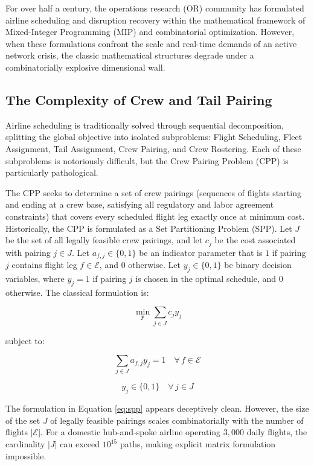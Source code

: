 \documentclass[11pt,a4paper]{book}
\begin{document}
For over half a century, the operations research (OR) community has formulated airline scheduling and disruption recovery within the mathematical framework of Mixed-Integer Programming (MIP) and combinatorial optimization. However, when these formulations confront the scale and real-time demands of an active network crisis, the classic mathematical structures degrade under a combinatorially explosive dimensional wall.

\subsection{The Complexity of Crew and Tail Pairing}\label{sec:crew_tail}

Airline scheduling is traditionally solved through sequential decomposition, splitting the global objective into isolated subproblems: Flight Scheduling, Fleet Assignment, Tail Assignment, Crew Pairing, and Crew Rostering. Each of these subproblems is notoriously difficult, but the Crew Pairing Problem (CPP) is particularly pathological. 

The CPP seeks to determine a set of crew pairings (sequences of flights starting and ending at a crew base, satisfying all regulatory and labor agreement constraints) that covers every scheduled flight leg exactly once at minimum cost. Historically, the CPP is formulated as a Set Partitioning Problem (SPP). Let $J$ be the set of all legally feasible crew pairings, and let $c_j$ be the cost associated with pairing $j \in J$. Let $a_{f, j} \in \{0, 1\}$ be an indicator parameter that is $1$ if pairing $j$ contains flight leg $f \in \mathcal{E}$, and $0$ otherwise. Let $y_j \in \{0, 1\}$ be binary decision variables, where $y_j = 1$ if pairing $j$ is chosen in the optimal schedule, and $0$ otherwise. The classical formulation is:

\begin{equation}
\label{eq:spp}
\min_{\mathbf{y}} \sum_{j \in J} c_j y_j
\end{equation}

subject to:

\begin{equation}
\label{eq:spp_const}
\sum_{j \in J} a_{f, j} y_j = 1 \quad \forall \, f \in \mathcal{E}
\end{equation}

\begin{equation}
y_j \in \{0, 1\} \quad \forall \, j \in J
\end{equation}

The formulation in Equation \ref{eq:spp} appears deceptively clean. However, the size of the set $J$ of legally feasible pairings scales combinatorially with the number of flights $|\mathcal{E}|$. For a domestic hub-and-spoke airline operating $3,000$ daily flights, the cardinality $|J|$ can exceed $10^{15}$ paths, making explicit matrix formulation impossible.
\end{document}
